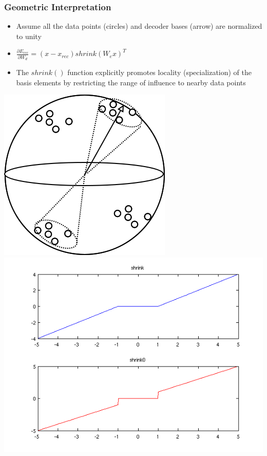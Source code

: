 \documentclass{beamer}
\begin{document}
\begin{frame}
\frametitle{Geometric Interpretation} 
\begin{itemize}
\item{Assume all the data points (circles) and decoder bases (arrow) are normalized to unity}
\item{$\frac{\partial E_{rec}}{\partial W_d} = (x-x_{rec})shrink(W_ex)^T$}  
\item{The $shrink()$ function explicitly promotes locality (specialization) of the basis elements by restricting the range of influence to nearby data points}
\end{itemize} 
\begin{center}
\includegraphics[scale = 0.40]{shrink_geom.png}  
\includegraphics[scale = 0.25]{shrink0.png}  
\end{center} 
\end{frame}
\end{document}
